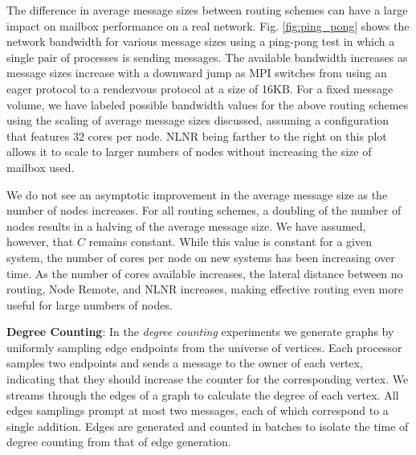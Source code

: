 \documentclass[10]{report}
\begin{document}
The difference in average message sizes between routing schemes can have a large impact on mailbox performance on a real network. 
Fig. \ref{fig:ping_pong} shows the network bandwidth for various message sizes using a ping-pong test in which a single pair of processes is sending messages. 
The available bandwidth increases as message sizes increase with a downward jump as MPI switches from using an eager protocol to a rendezvous protocol at a size of 16KB. 
For a fixed message volume, we have labeled possible bandwidth values for the above routing schemes using the scaling of average
message sizes discussed, assuming a configuration that features 32 cores per node. 
NLNR being farther to the right on this plot allows it to scale to larger numbers of nodes without increasing the size of mailbox used.

We do not see an asymptotic improvement in the average message size as the number of nodes increases. 
For all routing schemes, a doubling of the number of nodes results in a halving of the average message size. 
We have assumed, however, that $C$ remains constant. 
While this value is constant for a given system, the number of cores per node on new systems has been increasing over time. 
As the number of cores available increases, the lateral distance between no routing, Node Remote, and NLNR increases, making effective routing even more useful for large numbers of nodes.

\noindent
\textbf{Degree Counting}:
In the \emph{degree counting} experiments we generate graphs by uniformly sampling edge endpoints from the universe of vertices.
Each processor samples two endpoints and sends a message to the owner of each vertex, indicating that they should increase the counter for the corresponding vertex. 
We streams through the edges of a graph to calculate the degree of each vertex. 
All edges samplings prompt at most two messages, each of which correspond to a single addition. 
Edges are generated and counted in batches to isolate the time of degree counting from that of edge generation.
\end{document}
